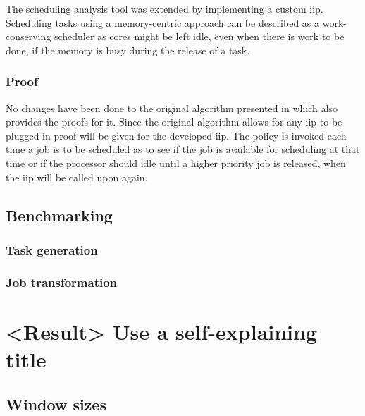 \documentclass{kththesis}
\begin{document}
The scheduling analysis tool was extended by implementing a custom \acrshort{iip}. Scheduling tasks
using a memory-centric approach can be described as a work-conserving scheduler as cores might be
left idle, even when there is work to be done, if the memory is busy during the release of a task. 


\subsection{Proof}

No changes have been done to the original algorithm presented in \parencite{nasri_exact_2017} which
also provides the proofs for it. Since the original algorithm allows for any \acrshort{iip} to be
plugged in proof will be given for the developed \acrshort{iip}. The policy is invoked each time a
job is to be scheduled as to see if the job is available for scheduling at that time or if the
processor should idle until a higher priority job is released, when the \acrshort{iip} will be
called upon again.

%



\section{Benchmarking}

\subsection{Task generation}

\subsection{Job transformation}



\chapter{<Result> Use a self-explaining title}

\section{Window sizes}
\end{document}
